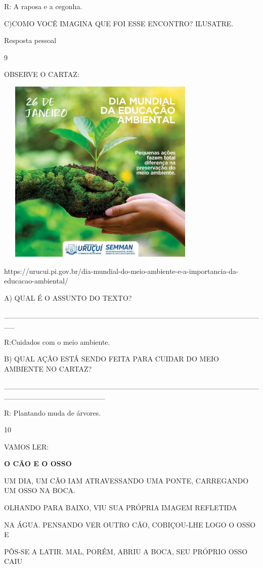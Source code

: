 {{R: A raposa e a cegonha.

C)COMO VOCÊ IMAGINA QUE FOI ESSE ENCONTRO? ILUSATRE.

Resposta pessoal

\num{9}

OBSERVE O CARTAZ:

\includegraphics[width=3.96154in,height=3.50028in]{media/image123.jpeg}

https://urucui.pi.gov.br/dia-mundial-do-meio-ambiente-e-a-importancia-da-educacao-ambiental/

A) QUAL É O ASSUNTO DO TEXTO?

\_\_\_\_\_\_\_\_\_\_\_\_\_\_\_\_\_\_\_\_\_\_\_\_\_\_\_\_\_\_\_\_\_\_\_\_\_\_\_\_\_\_\_\_\_\_\_\_\_\_

R:Cuidados com o meio ambiente.

B) QUAL AÇÃO ESTÁ SENDO FEITA PARA CUIDAR DO MEIO AMBIENTE NO CARTAZ?

\_\_\_\_\_\_\_\_\_\_\_\_\_\_\_\_\_\_\_\_\_\_\_\_\_\_\_\_\_\_\_\_\_\_\_\_\_\_\_\_\_\_\_\_\_\_\_\_\_\_\_\_\_\_\_\_\_\_\_\_\_\_\_\_\_\_\_

R: Plantando muda de árvores.

\num{10}

VAMOS LER:

\textbf{O CÃO E O OSSO}

UM DIA, UM CÃO IAM ATRAVESSANDO UMA PONTE, CARREGANDO UM OSSO NA BOCA.

OLHANDO PARA BAIXO, VIU SUA PRÓPRIA IMAGEM REFLETIDA

NA ÁGUA. PENSANDO VER OUTRO CÃO, COBIÇOU-LHE LOGO O OSSO E

PÔS-SE A LATIR. MAL, PORÉM, ABRIU A BOCA, SEU PRÓPRIO OSSO CAIU

}}
